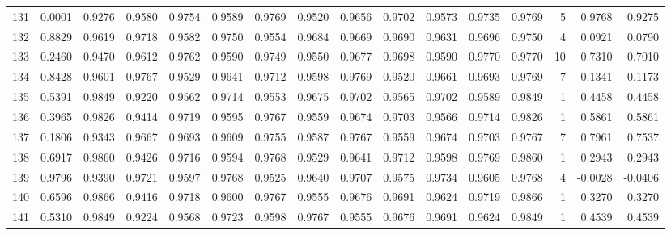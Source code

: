 \begin{tabular}{lrrrrrrrrrrrrrrr}
131 &      0.0001 &  0.9276 &  0.9580 &  0.9754 &  0.9589 &  0.9769 &  0.9520 &  0.9656 &  0.9702 &  0.9573 &   0.9735 &     0.9769 &      5 &                    0.9768 &                     0.9275 \\
132 &      0.8829 &  0.9619 &  0.9718 &  0.9582 &  0.9750 &  0.9554 &  0.9684 &  0.9669 &  0.9690 &  0.9631 &   0.9696 &     0.9750 &      4 &                    0.0921 &                     0.0790 \\
133 &      0.2460 &  0.9470 &  0.9612 &  0.9762 &  0.9590 &  0.9749 &  0.9550 &  0.9677 &  0.9698 &  0.9590 &   0.9770 &     0.9770 &     10 &                    0.7310 &                     0.7010 \\
134 &      0.8428 &  0.9601 &  0.9767 &  0.9529 &  0.9641 &  0.9712 &  0.9598 &  0.9769 &  0.9520 &  0.9661 &   0.9693 &     0.9769 &      7 &                    0.1341 &                     0.1173 \\
135 &      0.5391 &  0.9849 &  0.9220 &  0.9562 &  0.9714 &  0.9553 &  0.9675 &  0.9702 &  0.9565 &  0.9702 &   0.9589 &     0.9849 &      1 &                    0.4458 &                     0.4458 \\
136 &      0.3965 &  0.9826 &  0.9414 &  0.9719 &  0.9595 &  0.9767 &  0.9559 &  0.9674 &  0.9703 &  0.9566 &   0.9714 &     0.9826 &      1 &                    0.5861 &                     0.5861 \\
137 &      0.1806 &  0.9343 &  0.9667 &  0.9693 &  0.9609 &  0.9755 &  0.9587 &  0.9767 &  0.9559 &  0.9674 &   0.9703 &     0.9767 &      7 &                    0.7961 &                     0.7537 \\
138 &      0.6917 &  0.9860 &  0.9426 &  0.9716 &  0.9594 &  0.9768 &  0.9529 &  0.9641 &  0.9712 &  0.9598 &   0.9769 &     0.9860 &      1 &                    0.2943 &                     0.2943 \\
139 &      0.9796 &  0.9390 &  0.9721 &  0.9597 &  0.9768 &  0.9525 &  0.9640 &  0.9707 &  0.9575 &  0.9734 &   0.9605 &     0.9768 &      4 &                   -0.0028 &                    -0.0406 \\
140 &      0.6596 &  0.9866 &  0.9416 &  0.9718 &  0.9600 &  0.9767 &  0.9555 &  0.9676 &  0.9691 &  0.9624 &   0.9719 &     0.9866 &      1 &                    0.3270 &                     0.3270 \\
141 &      0.5310 &  0.9849 &  0.9224 &  0.9568 &  0.9723 &  0.9598 &  0.9767 &  0.9555 &  0.9676 &  0.9691 &   0.9624 &     0.9849 &      1 &                    0.4539 &                     0.4539 \\

\end{tabular}

